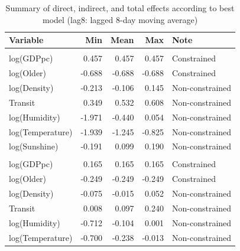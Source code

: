 \documentclass[]{elsarticle} %
\begin{document}
\begin{table}

\caption{\label{tab:summary-impacts-best-model}\label{tab:summary-impacts-best-model}Summary of direct, indirect, and total effects according to best model (lag8: lagged 8-day moving average)}
\centering
\begin{tabular}[t]{lrrrl}
\toprule
Variable & Min & Mean & Max & Note\\
\midrule
\rowcolor{gray!6}  \addlinespace[0.3em]
\multicolumn{5}{l}{\textbf{Direct Effects}}\\
\hspace{1em}log(GDPpc) & 0.457 & 0.457 & 0.457 & Constrained\\
\hspace{1em}log(Older) & -0.688 & -0.688 & -0.688 & Constrained\\
\rowcolor{gray!6}  \hspace{1em}log(Density) & -0.213 & -0.106 & 0.145 & Non-constrained\\
\hspace{1em}Transit & 0.349 & 0.532 & 0.608 & Non-constrained\\
\rowcolor{gray!6}  \hspace{1em}log(Humidity) & -1.971 & -0.440 & 0.054 & Non-constrained\\
\hspace{1em}log(Temperature) & -1.939 & -1.245 & -0.825 & Non-constrained\\
\rowcolor{gray!6}  \hspace{1em}log(Sunshine) & -0.191 & 0.099 & 0.190 & Non-constrained\\
\addlinespace[0.3em]
\multicolumn{5}{l}{\textbf{Indirect Effects}}\\
\hspace{1em}log(GDPpc) & 0.165 & 0.165 & 0.165 & Constrained\\
\rowcolor{gray!6}  \hspace{1em}log(Older) & -0.249 & -0.249 & -0.249 & Constrained\\
\hspace{1em}log(Density) & -0.075 & -0.015 & 0.052 & Non-constrained\\
\rowcolor{gray!6}  \hspace{1em}Transit & 0.008 & 0.097 & 0.240 & Non-constrained\\
\hspace{1em}log(Humidity) & -0.712 & -0.104 & 0.001 & Non-constrained\\
\rowcolor{gray!6}  \hspace{1em}log(Temperature) & -0.700 & -0.238 & -0.013 & Non-constrained\\

\end{tabular}
\end{table}
\end{document}
